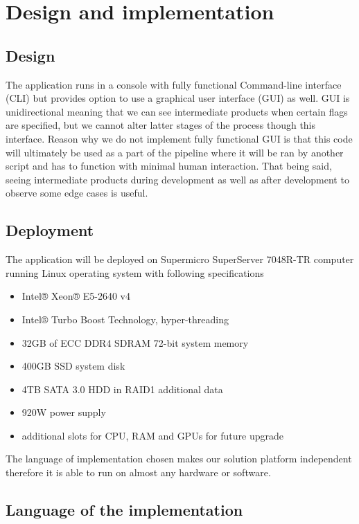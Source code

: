 \documentclass[12pt, a4paper, oneside]{book}
\begin{document}
\chapter{Design and implementation}

\section{Design}

The application runs in a console with fully functional Command-line interface (CLI) but provides option to use a graphical user interface (GUI) as well.
GUI is unidirectional meaning that we can see intermediate products when certain flags are specified, but we cannot alter latter stages of the process though this interface.
Reason why we do not implement fully functional GUI is that this code will ultimately be used as a part of the pipeline where it will be ran by another script and has to function with minimal human interaction.
That being said, seeing intermediate products during development as well as after development to observe some edge cases is useful.

\section{Deployment}

The application will be deployed on Supermicro SuperServer 7048R-TR computer running Linux operating system with following specifications

\begin{itemize}
    \item Intel® Xeon® E5-2640 v4
    \item Intel® Turbo Boost Technology, hyper-threading
    \item 32GB of ECC DDR4 SDRAM 72-bit system memory
    \item 400GB SSD system disk
    \item 4TB SATA 3.0 HDD in RAID1 additional data
    \item 920W power supply
    \item additional slots for CPU, RAM and GPUs for future upgrade
\end{itemize}

The language of implementation chosen makes our solution platform independent therefore it is able to run on almost any hardware or software.

\section{Language of the implementation}
\end{document}
